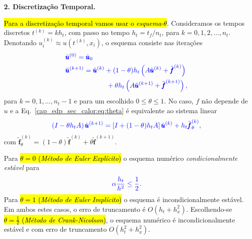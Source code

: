 \begin{flushleft}
  \textbf{2. Discretização Temporal.}
\end{flushleft}

\hl{Para a discretização temporal vamos usar o \emph{esquema-$\theta$}}. Consideramos os tempos discretos $t^{(k)} = kh_t$, com passo no tempo $h_t = t_f/n_t$, para $k = 0, 1, 2, \dotsc, n_t$. Denotando $u^{(k)}_i \approx u\left(t^{(k)}, x_i\right)$, o esquema consiste nas iterações
\begin{subequations}\hleq
  \begin{align}
    &\tilde{\pmb{u}}^{(0)} = \tilde{\pmb{u}}_0\\
    &\tilde{\pmb{u}}^{(k+1)} = \tilde{\pmb{u}}^{(k)} + (1-\theta)h_t\left(A\tilde{\pmb{u}}^{(k)}+\tilde{\pmb{f}}^{(k)}\right)\nonumber\\
    &\qquad\qquad\qquad + \theta h_t\left(A\tilde{\pmb{u}}^{(k+1)}+\tilde{\pmb{f}}^{(k+1)}\right),\label{cap_edp_sec_calor:eq:theta}
  \end{align}
\end{subequations}
para $k = 0, 1, \dotsc, n_t-1$ e para um escolhido $0 \leq \theta \leq 1$. No caso, $f$ não depende de $u$ e a Eq.~\eqref{cap_edp_sec_calor:eq:theta} é equivalente ao sistema linear
\begin{equation}\color{blue}\left(I - \theta h_t A\right)\tilde{\pmb{u}}^{(k+1)} = \left[I + (1-\theta)h_tA\right]\tilde{\pmb{u}}^{(k)} + h_t\tilde{\pmb{f}}_\theta^{(k)},
\end{equation}
com $\tilde{\pmb{f}}_\theta^{(k)} = (1-\theta)\tilde{\pmb{f}}^{(k)} + \theta\tilde{\pmb{f}}^{(k+1)}$.

\begin{obs}
  Para \hl{$\theta = 0$ (\emph{Método de Euler Explícito})} o esquema numérico \emph{condicionalmente estável} \cite[Cap. 12, Seç. 2]{Burden2016a} para
  \begin{equation}\label{cap_edp_sec_calor:eq:condest}\color{blue}\alpha\frac{h_t}{h^2}\leq \frac{1}{2}.
  \end{equation}
  Para \hl{$\theta = 1$ (\emph{Método de Euler Implícito})} o esquema é incondicionalmente estável. Em ambos estes casos, o erro de truncamento é $O(h_t + h_x^2)$. Escolhendo-se \hl{$\theta=\frac{1}{2}$ (\emph{Método de Crank-Nicolson})}, o esquema numérico é incondicionalmente estável e com erro de truncamento $O(h_t^2 + h_x^2)$. 
\end{obs}

